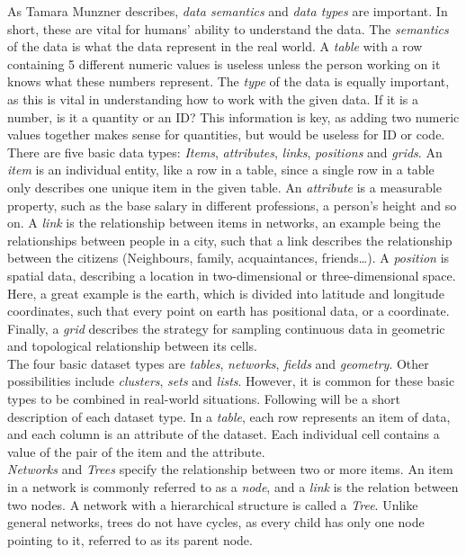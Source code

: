 \documentclass[Report.tex]{subfiles}
\begin{document}
As Tamara Munzner describes, \emph{data semantics} and \emph{data types} are important. In short, these are vital for humans’ ability to understand the data. The \emph{semantics} of the data is what the data represent in the real world. A \emph{table} with a row containing 5 different numeric values is useless unless the person working on it knows what these numbers represent. The \emph{type} of the data is equally important, as this is vital in understanding how to work with the given data. If it is a number, is it a quantity or an ID? This information is key, as adding two numeric values together makes sense for quantities, but would be useless for ID or code.\\
There are five basic data types: \emph{Items}, \emph{attributes}, \emph{links}, \emph{positions} and \emph{grids}. An \emph{item} is an individual entity, like a row in a table, since a single row in a table only describes one unique item in the given table. An \emph{attribute} is a measurable property, such as the base salary in different professions, a person’s height and so on. A \emph{link} is the relationship between items in networks, an example being the relationships between people in a city, such that a link describes the relationship between the citizens (Neighbours, family, acquaintances, friends…). A \emph{position} is spatial data, describing a location in two-dimensional or three-dimensional space. Here, a great example is the earth, which is divided into latitude and longitude coordinates, such that every point on earth has positional data, or a coordinate. Finally, a \emph{grid} describes the strategy for sampling continuous data in geometric and topological relationship between its cells.\\
The four basic dataset types are \emph{tables}, \emph{networks}, \emph{fields} and \emph{geometry}. Other possibilities include \emph{clusters}, \emph{sets} and \emph{lists}. However, it is common for these basic types to be combined in real-world situations. Following will be a short description of each dataset type. 
In a \emph{table}, each row represents an item of data, and each column is an attribute of the dataset. Each individual cell contains a value of the pair of the item and the attribute.\\

\emph{Networks} and \emph{Trees} specify the relationship between two or more items. An item in a network is commonly referred to as a \emph{node}, and a \emph{link} is the relation between two nodes. 
A network with a hierarchical structure is called a \emph{Tree}. Unlike general networks, trees do not have cycles, as every child has only one node pointing to it, referred to as its parent node.\\
\end{document}
